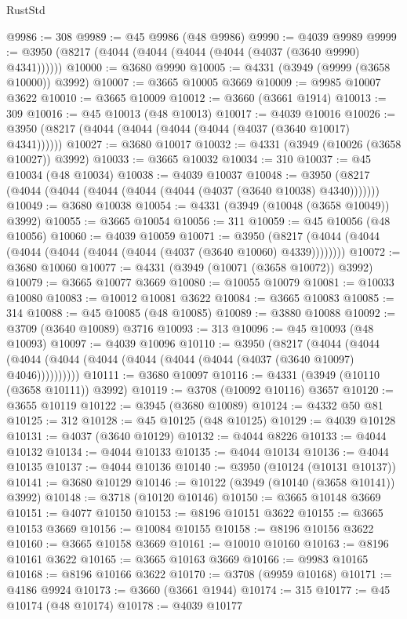 \begin{lexlean}{RustStd}
\begin{coremodule}
@9986 := 308
@9989 := @45 @9986 (@48 @9986)
@9990 := @4039 @9989
@9999 := @3950 (@8217 (@4044 (@4044 (@4044 (@4044 (@4037 (@3640 @9990) @4341))))))
@10000 := @3680 @9990
@10005 := @4331 (@3949 (@9999 (@3658 @10000)) @3992)
@10007 := @3665 @10005 @3669
@10009 := @9985 @10007 @3622
@10010 := @3665 @10009
@10012 := @3660 (@3661 @1914)
@10013 := 309
@10016 := @45 @10013 (@48 @10013)
@10017 := @4039 @10016
@10026 := @3950 (@8217 (@4044 (@4044 (@4044 (@4044 (@4037 (@3640 @10017) @4341))))))
@10027 := @3680 @10017
@10032 := @4331 (@3949 (@10026 (@3658 @10027)) @3992)
@10033 := @3665 @10032
@10034 := 310
@10037 := @45 @10034 (@48 @10034)
@10038 := @4039 @10037
@10048 := @3950 (@8217 (@4044 (@4044 (@4044 (@4044 (@4044 (@4037 (@3640 @10038) @4340)))))))
@10049 := @3680 @10038
@10054 := @4331 (@3949 (@10048 (@3658 @10049)) @3992)
@10055 := @3665 @10054
@10056 := 311
@10059 := @45 @10056 (@48 @10056)
@10060 := @4039 @10059
@10071 := @3950 (@8217 (@4044 (@4044 (@4044 (@4044 (@4044 (@4044 (@4037 (@3640 @10060) @4339))))))))
@10072 := @3680 @10060
@10077 := @4331 (@3949 (@10071 (@3658 @10072)) @3992)
@10079 := @3665 @10077 @3669
@10080 := @10055 @10079
@10081 := @10033 @10080
@10083 := @10012 @10081 @3622
@10084 := @3665 @10083
@10085 := 314
@10088 := @45 @10085 (@48 @10085)
@10089 := @3880 @10088
@10092 := @3709 (@3640 @10089) @3716
@10093 := 313
@10096 := @45 @10093 (@48 @10093)
@10097 := @4039 @10096
@10110 := @3950
    (@8217
      (@4044 (@4044 (@4044 (@4044 (@4044 (@4044 (@4044 (@4044 (@4037 (@3640 @10097) @4046))))))))))
@10111 := @3680 @10097
@10116 := @4331 (@3949 (@10110 (@3658 @10111)) @3992)
@10119 := @3708 (@10092 @10116) @3657
@10120 := @3655 @10119
@10122 := @3945 (@3680 @10089)
@10124 := @4332 @50 @81
@10125 := 312
@10128 := @45 @10125 (@48 @10125)
@10129 := @4039 @10128
@10131 := @4037 (@3640 @10129)
@10132 := @4044 @8226
@10133 := @4044 @10132
@10134 := @4044 @10133
@10135 := @4044 @10134
@10136 := @4044 @10135
@10137 := @4044 @10136
@10140 := @3950 (@10124 (@10131 @10137))
@10141 := @3680 @10129
@10146 := @10122 (@3949 (@10140 (@3658 @10141)) @3992)
@10148 := @3718 (@10120 @10146)
@10150 := @3665 @10148 @3669
@10151 := @4077 @10150
@10153 := @8196 @10151 @3622
@10155 := @3665 @10153 @3669
@10156 := @10084 @10155
@10158 := @8196 @10156 @3622
@10160 := @3665 @10158 @3669
@10161 := @10010 @10160
@10163 := @8196 @10161 @3622
@10165 := @3665 @10163 @3669
@10166 := @9983 @10165
@10168 := @8196 @10166 @3622
@10170 := @3708 (@9959 @10168)
@10171 := @4186 @9924
@10173 := @3660 (@3661 @1944)
@10174 := 315
@10177 := @45 @10174 (@48 @10174)
@10178 := @4039 @10177

\end{coremodule}
\end{lexlean}
